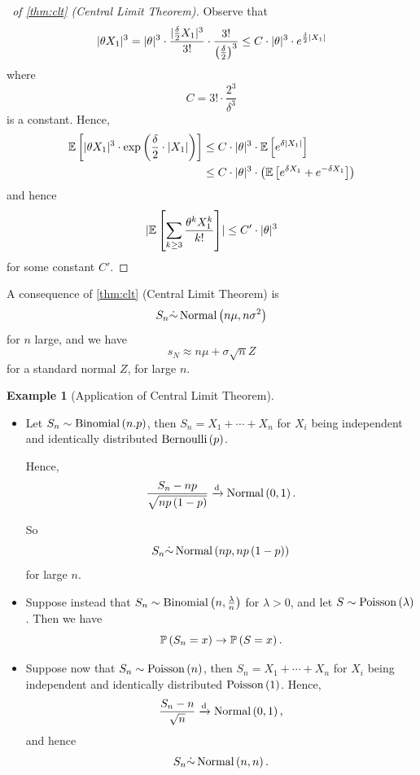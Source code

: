 \documentclass{article}
\theoremstyle{definition}
\newtheorem{example}[theorem]{Example}
\theoremstyle{remark}
\DeclarePairedDelimiter{\abs}{\lvert}{\rvert}
\newcommand{\Prob}{\mathbb{P}}
\newcommand{\Expt}{\mathbb{E}}
\newcommand{\toDist}{\xrightarrow{\mathrm{d}}}
\newcommand{\Bernoulli}{\operatorname{Bernoulli}}
\newcommand{\Binomial}{\operatorname{Binomial}}
\newcommand{\Poisson}{\operatorname{Poisson}}
\newcommand{\Normal}{\operatorname{Normal}}
\begin{document}
\begin{proof}[\proofname\ of \autoref{thm:clt} (Central Limit Theorem)]
    Observe that
    \[
        \abs{\theta X_1}^3 = \abs{\theta}^3 \cdot \frac{\abs{\frac{\delta}{2} X_1}^3}{3!} \cdot \frac{3!}{\pqty{\frac{\delta}{2}}^3} \leq C \cdot \abs{\theta}^3 \cdot e^{\frac{\delta}{2} \abs{X_1}}
    \]
    where
    \[
        C = 3! \cdot \frac{2^3}{\delta^3}
    \]
    is a constant. Hence,
    \begin{align*}
        \Expt\bqty{\abs{\theta X_1}^3 \cdot \exp \pqty{\frac{\delta}{2} \cdot \abs{X_1}}} &\leq C \cdot \abs{\theta}^3 \cdot \Expt\bqty{e^{\delta \abs{X_1}}} \\
        &\leq C \cdot \abs{\theta}^3 \cdot \pqty{\Expt\bqty{e^{\delta X_1} + e^{- \delta X_1}}}
    \end{align*}
    and hence
    \[
        \abs{\Expt\bqty{\sum_{k \geq 3} \frac{\theta^k X_1^k}{k!}}} \leq C' \cdot \abs{\theta}^3
    \]
    for some constant \(C'\).
\end{proof}

A consequence of \autoref{thm:clt} (Central Limit Theorem) is
\[
    S_n \dot{\sim} \Normal\pqty{n \mu, n \sigma^2}
\]
for \(n\) large, and we have
\[
    s_N \approx n \mu + \sigma \sqrt{n} Z
\]
for a standard normal \(Z\), for large \(n\).

\begin{example}[Application of Central Limit Theorem]
    \label{ex:clt}%
    \begin{itemize}
        \item Let \(S_n \sim \Binomial\pqty{n. p}\), then \(S_n = X_1 + \cdots + X_n\) for \(X_i\) being independent and identically distributed \(\Bernoulli \pqty{p}\).

        Hence,
        \[
            \frac{S_n - np}{\sqrt{n p \pqty{1 - p}}} \toDist \Normal\pqty{0, 1}.
        \]

        So
        \[
            S_n \dot{\sim} \Normal\pqty{np, np\pqty{1 - p}}
        \]
        for large \(n\).

        \item Suppose instead that \(S_n \sim \Binomial\pqty{n, \frac{\lambda}{n}}\) for \(\lambda > 0\), and let \(S \sim \Poisson\pqty{\lambda}\). Then we have
        \[
            \Prob\pqty{S_n = x} \to \Prob\pqty{S = x}.
        \]

        \item Suppose now that \(S_n \sim \Poisson\pqty{n}\), then \(S_n = X_1 + \cdots + X_n\) for \(X_i\) being independent and identically distributed \(\Poisson \pqty{1}\). Hence,
        \[
            \frac{S_n - n}{\sqrt{n}} \toDist \Normal\pqty{0, 1},
        \]
        and hence
        \[
            S_n \dot{\sim} \Normal\pqty{n, n}.
        \]
    \end{itemize}
\end{example}
\end{document}
